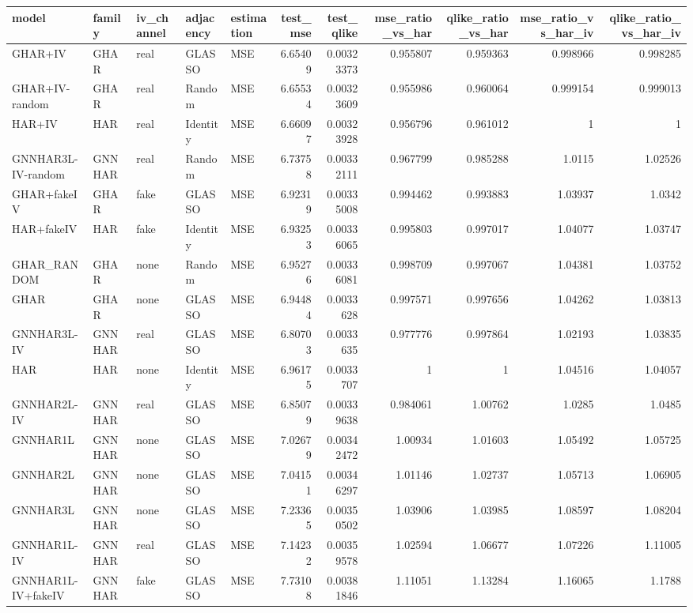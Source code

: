 \begin{tabular}{lllllrrrrrr}
\toprule
model & family & iv_channel & adjacency & estimation & test_mse & test_qlike & mse_ratio_vs_har & qlike_ratio_vs_har & mse_ratio_vs_har_iv & qlike_ratio_vs_har_iv \\
\midrule
GHAR+IV & GHAR & real & GLASSO & MSE & 6.65409 & 0.00323373 & 0.955807 & 0.959363 & 0.998966 & 0.998285 \\
GHAR+IV-random & GHAR & real & Random & MSE & 6.65534 & 0.00323609 & 0.955986 & 0.960064 & 0.999154 & 0.999013 \\
HAR+IV & HAR & real & Identity & MSE & 6.66097 & 0.00323928 & 0.956796 & 0.961012 & 1 & 1 \\
GNNHAR3L-IV-random & GNNHAR & real & Random & MSE & 6.73758 & 0.00332111 & 0.967799 & 0.985288 & 1.0115 & 1.02526 \\
GHAR+fakeIV & GHAR & fake & GLASSO & MSE & 6.92319 & 0.00335008 & 0.994462 & 0.993883 & 1.03937 & 1.0342 \\
HAR+fakeIV & HAR & fake & Identity & MSE & 6.93253 & 0.00336065 & 0.995803 & 0.997017 & 1.04077 & 1.03747 \\
GHAR_RANDOM & GHAR & none & Random & MSE & 6.95276 & 0.00336081 & 0.998709 & 0.997067 & 1.04381 & 1.03752 \\
GHAR & GHAR & none & GLASSO & MSE & 6.94484 & 0.0033628 & 0.997571 & 0.997656 & 1.04262 & 1.03813 \\
GNNHAR3L-IV & GNNHAR & real & GLASSO & MSE & 6.80703 & 0.0033635 & 0.977776 & 0.997864 & 1.02193 & 1.03835 \\
HAR & HAR & none & Identity & MSE & 6.96175 & 0.0033707 & 1 & 1 & 1.04516 & 1.04057 \\
GNNHAR2L-IV & GNNHAR & real & GLASSO & MSE & 6.85079 & 0.00339638 & 0.984061 & 1.00762 & 1.0285 & 1.0485 \\
GNNHAR1L & GNNHAR & none & GLASSO & MSE & 7.02679 & 0.00342472 & 1.00934 & 1.01603 & 1.05492 & 1.05725 \\
GNNHAR2L & GNNHAR & none & GLASSO & MSE & 7.04151 & 0.00346297 & 1.01146 & 1.02737 & 1.05713 & 1.06905 \\
GNNHAR3L & GNNHAR & none & GLASSO & MSE & 7.23365 & 0.00350502 & 1.03906 & 1.03985 & 1.08597 & 1.08204 \\
GNNHAR1L-IV & GNNHAR & real & GLASSO & MSE & 7.14232 & 0.00359578 & 1.02594 & 1.06677 & 1.07226 & 1.11005 \\
GNNHAR1L-IV+fakeIV & GNNHAR & fake & GLASSO & MSE & 7.73108 & 0.00381846 & 1.11051 & 1.13284 & 1.16065 & 1.1788 \\
\bottomrule
\end{tabular}
